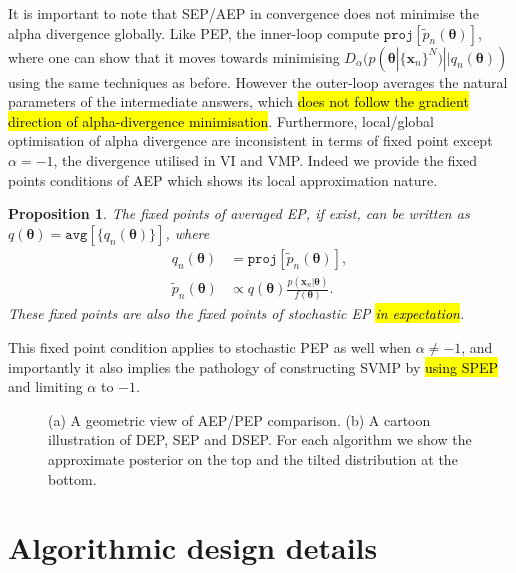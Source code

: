 \documentclass{article} %
\newtheorem{prop}{Proposition}
\begin{document}
It is important to note that SEP/AEP in convergence does not minimise the alpha divergence globally. Like PEP, the inner-loop compute $\mathtt{proj}[\tilde{p}_n(\bm{\theta})]$, where one can show that it moves towards minimising $D_{\alpha}(p(\bm{\theta} | \{\bm{x}_n\}^N) || q_n(\bm{\theta}))$ using the same techniques as before. However the outer-loop averages the natural parameters of the intermediate answers, which \hl{does not follow the gradient direction of alpha-divergence minimisation}. Furthermore, local/global optimisation of alpha divergence are inconsistent in terms of fixed point except $\alpha = -1$, the divergence utilised in VI and VMP. Indeed we provide the fixed points conditions of AEP which shows its local approximation nature.
%
\begin{prop}
The fixed points of averaged EP, if exist, can be written as $q(\bm{\theta}) = \mathtt{avg}[\{q_n(\bm{\theta})\}]$, where
\begin{align}
q_n(\bm{\theta}) &= \mathtt{proj}[\tilde{p}_n(\bm{\theta})], \\
\tilde{p}_n(\bm{\theta}) & \propto q(\bm{\theta}) \frac{p(\bm{x}_n|\bm{\theta})}{f(\bm{\theta})}.
\end{align}
These fixed points are also the fixed points of stochastic EP \hl{in expectation}. 
\end{prop}
%
This fixed point condition applies to stochastic PEP as well when $\alpha \neq -1$, and importantly it also implies the pathology of constructing SVMP by \hl{using SPEP} and limiting $\alpha$ to $-1$. 

%
\begin{figure}
\centering
\def\svgwidth{0.35\linewidth}
\subfigure[\label{fig:aep_vs_pep}]{
}
%
\hspace{0.5in}
%
\def\svgwidth{0.4\linewidth}
\subfigure[\label{fig:dep_sep_dsep}]{
}

\caption{(a) A geometric view of AEP/PEP comparison. (b) A cartoon illustration of DEP, SEP and DSEP. For each algorithm we show the approximate posterior on the top and the tilted distribution at the bottom.}

\end{figure}

\section{Algorithmic design details}
%
\end{document}
